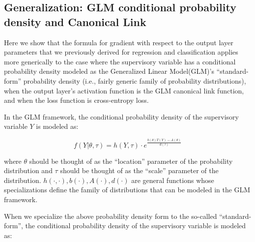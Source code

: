 \documentclass[10pt]{amsart}
\begin{document}
\begin{appendices}


\section{Generalization: GLM conditional probability density and Canonical Link} 
\label{appendix:CanonicalLink}

Here we show that the formula for gradient with respect to the output layer parameters that we previously derived for regression and classification applies more generically to the case where the supervisory variable has a conditional probability density modeled as the Generalized Linear Model(GLM)'s ``standard-form'' probability density (i.e., fairly generic family of probability distributions), when the output layer's activation function is the GLM canonical link function, and when the loss function is cross-entropy loss.

In the GLM framework, the conditional probability density of the supervisory variable $Y$ is modeled as:

$$f(Y | \theta, \tau) = h(Y, \tau) \cdot e^{\frac {b(\theta) T(Y) - A(\theta)} {d(\tau)}}$$

where $\theta$ should be thought of as the ``location'' parameter of the probability distribution and $\tau$ should be thought of as the ``scale'' parameter of the distribution. $h(\cdot, \cdot), b(\cdot), A(\cdot), d(\cdot)$ are general functions whose specializations define the family of distributions that can be modeled in the GLM framework.

When we specialize the above probability density form to the so-called ``standard-form'', the conditional probability density of the supervisory variable is modeled as:


\end{appendices}
\end{document}
